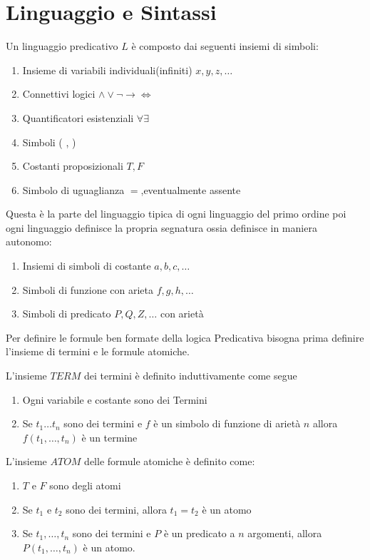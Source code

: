 \section{Linguaggio e Sintassi}
Un linguaggio predicativo $L$ è composto dai seguenti insiemi di simboli:
\begin{enumerate}
    \item Insieme di variabili individuali(infiniti) $x,y,z,\dots$
    \item Connettivi logici $\land \lor \neg \rightarrow \iff$
    \item Quantificatori esistenziali $\forall \exists$
    \item Simboli ( , )
    \item Costanti proposizionali $T,F$
    \item Simbolo di uguaglianza $=$,eventualmente assente
\end{enumerate}
Questa è la parte del linguaggio tipica di ogni linguaggio del primo ordine poi
ogni linguaggio definisce la propria segnatura ossia definisce in maniera autonomo:
\begin{enumerate}
    \item Insiemi di simboli di costante $a,b,c,\dots$
    \item Simboli di funzione con arieta $f,g,h,\dots$
    \item Simboli di predicato $P,Q,Z,\dots$ con arietà
\end{enumerate}


Per definire le formule ben formate della logica Predicativa bisogna prima definire
l'insieme di termini e le formule atomiche.

\begin{defi}
    L'insieme $TERM$ dei termini è definito induttivamente come segue
    \begin{enumerate}
        \item Ogni variabile e costante sono dei Termini
        \item Se $t_1 \dots t_n$ sono dei termini e $f$ è un simbolo di funzione di arietà $n$
              allora $f(t_1,\dots,t_n)$ è un termine
    \end{enumerate}
\end{defi}

\begin{defi}
    L'insieme $ATOM$ delle formule atomiche è definito come:
    \begin{enumerate}
        \item $T$ e $F$ sono degli atomi
        \item Se $t_1$ e $t_2$ sono dei termini, allora $t_1 = t_2$ è un atomo
        \item Se $t_1,\dots,t_n$ sono dei termini e $P$ è un predicato a $n$ argomenti,
              allora $P(t_1,\dots,t_n)$ è un atomo.
    \end{enumerate}
\end{defi}

